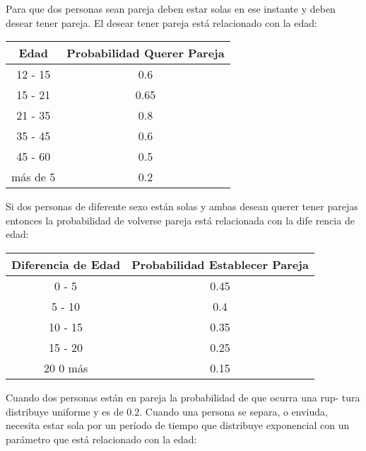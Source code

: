 \documentclass{article}
\begin{document}
            Para que dos personas sean pareja deben estar solas en ese instante y deben
            desear tener pareja. El desear tener pareja está relacionado con la edad:

            \begin{table}[h!]
                \begin{center}
                \begin{tabular}{| c | c |}
                \hline
                Edad & Probabilidad Querer Pareja \\ \hline
                12 - 15  &  0.6 \\ \hline
                15 - 21  &  0.65 \\ \hline
                21 - 35  &  0.8 \\ \hline
                35 - 45  &  0.6 \\ \hline
                45 - 60  &  0.5 \\ \hline
                más de 5  &  0.2 \\ \hline
                \end{tabular}
                \end{center}
            \end{table}

            Si dos personas de diferente sexo están solas y ambas desean querer tener
            parejas entonces la probabilidad de volverse pareja está relacionada con la dife
            rencia de edad:

            \begin{table}[h!]
                \begin{center}
                \begin{tabular}{| c | c |}
                \hline
                Diferencia de Edad & Probabilidad Establecer Pareja \\ \hline
                0 - 5  &  0.45 \\ \hline
                5 - 10  &  0.4 \\ \hline
                10 - 15  &  0.35 \\ \hline
                15 - 20  &  0.25 \\ \hline
                20 0 más  &  0.15 \\ \hline
                \end{tabular}
                \end{center}
            \end{table}

            \newpage
            Cuando dos personas están en pareja la probabilidad de que ocurra una rup-
            tura distribuye uniforme y es de 0.2. Cuando una persona se separa, o enviuda,
            necesita estar sola por un período de tiempo que distribuye exponencial con un
            parámetro que está relacionado con la edad:
\end{document}

